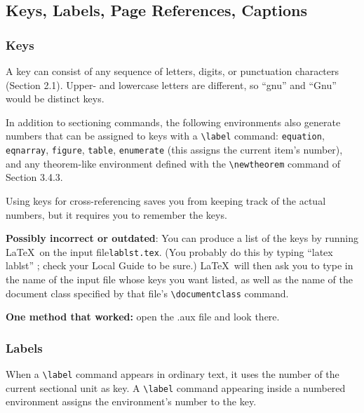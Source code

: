 \documentclass{article}
\begin{document}
\subsection{Keys, Labels, Page References, Captions}

\subsubsection{Keys}

A key can consist of any sequence of letters, digits, or punctuation characters (Section 2.1). 
Upper- and lowercase letters are different, so ``gnu'' and ``Gnu'' would be distinct keys. 

In addition to sectioning commands, the following environments also generate numbers that can be
assigned to keys with a \verb:\label: command: 
{\tt equation}, 
{\tt eqnarray},
{\tt figure}, 
{\tt table}, 
{\tt enumerate} (this assigns the current item's number), 
and any theorem-like environment defined with the \verb:\newtheorem: command of Section 3.4.3.

Using keys for cross-referencing saves you from keeping track of the actual numbers, but it requires
you to remember the keys. 

\textbf{Possibly incorrect or outdated}: You can produce a list of the keys by running \LaTeX\ on the
 input file{\tt lablst.tex}. (You probably do this by typing ``latex lablst'' ; check your Local
 Guide to be sure.) \LaTeX\ will then ask you to type in the name of the input file whose keys you
 want listed, as well as the name of the document class specified by that file's 
 \verb:\documentclass: command.
 
 \textbf{One method that worked:} open the .aux file and look there.
 
\subsubsection{Labels}

When a \verb:\label: command appears in ordinary text, it uses the number of the current
sectional unit as key. A \verb:\label: command appearing inside a numbered environment assigns
the environment's number to the key.
\end{document}
